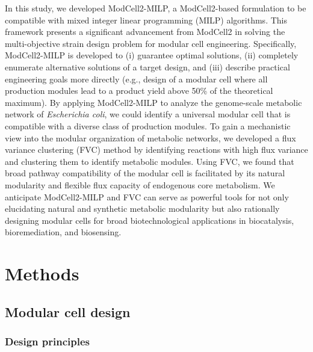 In this study, we developed ModCell2-MILP, a ModCell2-based formulation to be compatible with mixed integer linear programming (MILP) algorithms. This framework presents a significant advancement from ModCell2 in solving the multi-objective strain design problem for modular cell engineering. Specifically, ModCell2-MILP is developed to (i) guarantee optimal solutions, (ii) completely enumerate alternative solutions of a target design, and (iii) describe practical engineering goals more directly (e.g., design of a modular cell where all production modules lead to a product yield above 50\% of the theoretical maximum). By applying ModCell2-MILP to analyze the genome-scale metabolic network of \textit{Escherichia coli}, we could identify a universal modular cell that is compatible with a diverse class of production modules. To gain a mechanistic view into the modular organization of metabolic networks, we developed a flux variance clustering (FVC) method by identifying reactions with high flux variance and clustering them to identify metabolic modules. Using FVC, we found that broad pathway compatibility of the modular cell is facilitated by its natural modularity and flexible flux capacity of endogenous core metabolism. We anticipate ModCell2-MILP and FVC can serve as powerful tools for not only elucidating natural and synthetic metabolic modularity but also rationally designing modular cells for broad biotechnological applications in biocatalysis, bioremediation, and biosensing.

\section{Methods}
\subsection{Modular cell design}
\subsubsection{Design principles}

